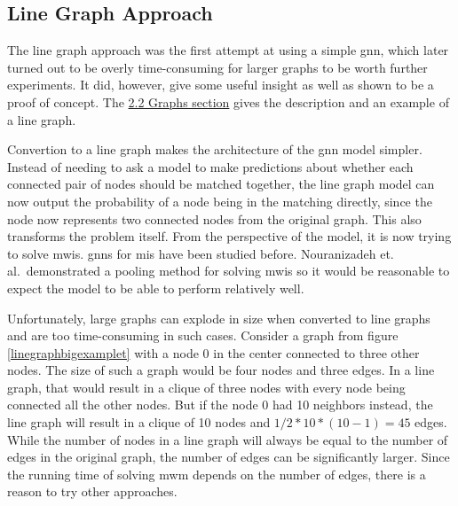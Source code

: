 \subsection{Line Graph Approach}

The line graph approach was the first attempt at using a simple \gls{gnn}, which later turned out to be overly time-consuming for larger graphs to be worth further experiments. It did, however, give some useful insight as well as shown to be a proof of concept. The \hyperref[sec:preprocessing]{2.2 Graphs section} gives the description and an example of a line graph.

Convertion to a line graph makes the architecture of the \gls{gnn} model simpler. Instead of needing to ask a model to make predictions about whether each connected pair of nodes should be matched together, the line graph model can now output the probability of a node being in the matching directly, since the node now represents two connected nodes from the original graph. This also transforms the problem itself. From the perspective of the model, it is now trying to solve \gls{mwis}. \gls{gnn}s for \gls{mis} have been studied before. Nouranizadeh et. al.\ demonstrated a pooling method for solving \gls{mwis} \cite{DBLPjournals/corr/abs-2107-01410} so it would be reasonable to expect the model to be able to perform relatively well. 

Unfortunately, large graphs can explode in size when converted to line graphs and are too time-consuming in such cases. Consider a graph from figure \ref{linegraphbigexamplet} with a node $0$ in the center connected to three other nodes. The size of such a graph would be four nodes and three edges. In a line graph, that would result in a clique of three nodes with every node being connected all the other nodes. But if the node $0$ had 10 neighbors instead, the line graph will result in a clique of 10 nodes and $1/2 * 10 * (10-1) = 45$ edges. While the number of nodes in a line graph will always be equal to the number of edges in the original graph, the number of edges can be significantly larger. Since the running time of solving \gls{mwm} depends on the number of edges, there is a reason to try other approaches.


